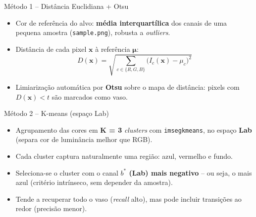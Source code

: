 \documentclass[aspectratio=169,11pt]{beamer}
\begin{document}
\begin{frame}{Método 1 -- Distância Euclidiana + Otsu}
  \begin{itemize}
    \item Cor de referência do alvo: \textbf{média interquartílica} dos canais de
      uma pequena amostra (\texttt{sample.png}), robusta a \emph{outliers}.
    \item Distância de cada pixel $\mathbf{x}$ à referência $\boldsymbol{\mu}$:
      \begin{equation*}
        D(\mathbf{x}) = \sqrt{\sum_{c \in \{R,G,B\}} \big(I_c(\mathbf{x}) - \mu_c\big)^2}
      \end{equation*}
    \item Limiarização automática por \textbf{Otsu} sobre o mapa de distância:
      pixels com $D(\mathbf{x}) < t$ são marcados como vaso.
  \end{itemize}
\end{frame}

\begin{frame}{Método 2 -- K-means (espaço Lab)}
  \begin{itemize}
    \item Agrupamento das cores em \textbf{K = 3} \emph{clusters} com
      \texttt{imsegkmeans}, no espaço \textbf{Lab} (separa cor de luminância
      melhor que RGB).
    \item Cada cluster captura naturalmente uma região: azul, vermelho e fundo.
    \item Seleciona-se o cluster com o canal \textbf{$b^\ast$ (Lab) mais negativo}
      -- ou seja, o mais azul (critério intrínseco, sem depender da amostra).
    \item Tende a recuperar todo o vaso (\emph{recall} alto), mas pode incluir
      transições ao redor (precisão menor).
  \end{itemize}
\end{frame}
\end{document}
